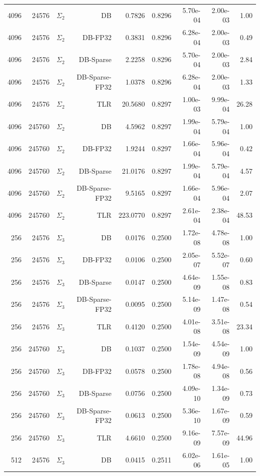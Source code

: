 \begin{tabular}{|r|r|r|r|r|r|r|r|r|}
  4096 & 24576 & $\Sigma_2$ & DB & 0.7826 & 0.8296 & 5.70e-04 & 2.00e-03 & 1.00 \\
  4096 & 24576 & $\Sigma_2$ & DB-FP32 & 0.3831 & 0.8296 & 6.28e-04 & 2.00e-03 & 0.49 \\
  4096 & 24576 & $\Sigma_2$ & DB-Sparse & 2.2258 & 0.8296 & 5.70e-04 & 2.00e-03 & 2.84 \\
  4096 & 24576 & $\Sigma_2$ & DB-Sparse-FP32 & 1.0378 & 0.8296 & 6.28e-04 & 2.00e-03 & 1.33 \\
  4096 & 24576 & $\Sigma_2$ & TLR & 20.5680 & 0.8297 & 1.00e-03 & 9.99e-04 & 26.28 \\
  4096 & 245760 & $\Sigma_2$ & DB & 4.5962 & 0.8297 & 1.99e-04 & 5.79e-04 & 1.00 \\
  4096 & 245760 & $\Sigma_2$ & DB-FP32 & 1.9244 & 0.8297 & 1.66e-04 & 5.96e-04 & 0.42 \\
  4096 & 245760 & $\Sigma_2$ & DB-Sparse & 21.0176 & 0.8297 & 1.99e-04 & 5.79e-04 & 4.57 \\
  4096 & 245760 & $\Sigma_2$ & DB-Sparse-FP32 & 9.5165 & 0.8297 & 1.66e-04 & 5.96e-04 & 2.07 \\
  4096 & 245760 & $\Sigma_2$ & TLR & 223.0770 & 0.8297 & 2.61e-04 & 2.38e-04 & 48.53 \\
  256 & 24576 & $\Sigma_3$ & DB & 0.0176 & 0.2500 & 1.72e-08 & 4.78e-08 & 1.00 \\
  256 & 24576 & $\Sigma_3$ & DB-FP32 & 0.0106 & 0.2500 & 2.05e-07 & 5.52e-07 & 0.60 \\
  256 & 24576 & $\Sigma_3$ & DB-Sparse & 0.0147 & 0.2500 & 4.64e-09 & 1.55e-08 & 0.83 \\
  256 & 24576 & $\Sigma_3$ & DB-Sparse-FP32 & 0.0095 & 0.2500 & 5.14e-09 & 1.47e-08 & 0.54 \\
  256 & 24576 & $\Sigma_3$ & TLR & 0.4120 & 0.2500 & 4.01e-08 & 3.51e-08 & 23.34 \\
  256 & 245760 & $\Sigma_3$ & DB & 0.1037 & 0.2500 & 1.54e-09 & 4.54e-09 & 1.00 \\
  256 & 245760 & $\Sigma_3$ & DB-FP32 & 0.0578 & 0.2500 & 1.78e-08 & 4.94e-08 & 0.56 \\
  256 & 245760 & $\Sigma_3$ & DB-Sparse & 0.0756 & 0.2500 & 4.09e-10 & 1.34e-09 & 0.73 \\
  256 & 245760 & $\Sigma_3$ & DB-Sparse-FP32 & 0.0613 & 0.2500 & 5.36e-10 & 1.67e-09 & 0.59 \\
  256 & 245760 & $\Sigma_3$ & TLR & 4.6610 & 0.2500 & 9.16e-09 & 7.57e-09 & 44.96 \\
  512 & 24576 & $\Sigma_3$ & DB & 0.0415 & 0.2511 & 6.02e-06 & 1.61e-05 & 1.00 \\

\end{tabular}
